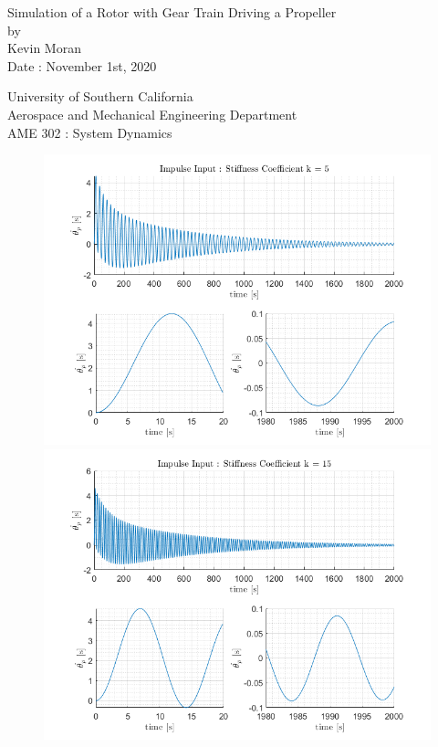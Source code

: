 \documentclass[letterpaper,12pt]{article}
\begin{document}
\begin{titlepage}
 \begin{center}
 \vspace*{1in}
{\Huge Simulation of a Rotor with Gear Train Driving a Propeller}\\
    \bigskip
    by\\
    \bigskip
    {\Large Kevin Moran} \\
    \bigskip
    Date : November 1st, 2020

    \bigskip\bigskip\bigskip
    University of Southern California\\
    Aerospace and Mechanical Engineering Department\\
    AME 302 : System Dynamics
 \end{center}
\end{titlepage}


\begin{figure}[ht]
    \centering
    \includegraphics[scale = .8]{Images/Impulse_k5.png}
    \includegraphics[scale = .8]{Images/Impulse_k15.png}
\end{figure}
\end{document}
